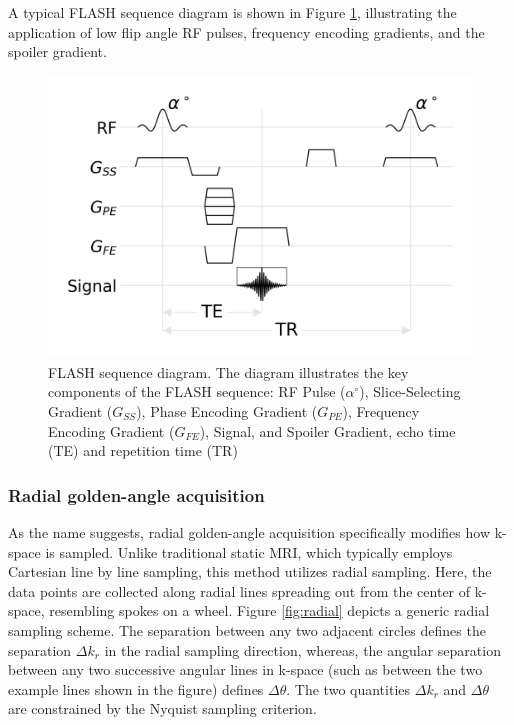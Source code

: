\documentclass{micro-econ-thesis}
\begin{document}
A typical FLASH sequence diagram is shown in Figure \ref{fig:gresimplified}, illustrating the application of low flip angle RF pulses, frequency encoding gradients, and the spoiler gradient.

\begin{figure}[H]
	\centering
	\includegraphics[width=0.7\linewidth]{flash_seq}
	\caption{FLASH sequence diagram. The diagram illustrates the key components of the FLASH sequence: RF Pulse ($\alpha^\circ$), Slice-Selecting Gradient ($G_{SS}$), Phase Encoding Gradient ($G_{PE}$), Frequency Encoding Gradient ($G_{FE}$), Signal, and Spoiler Gradient, echo time (TE) and repetition time (TR)}
	\label{fig:gresimplified}
\end{figure}

\subsubsection{Radial golden-angle acquisition}


As the name suggests, radial golden-angle acquisition specifically modifies how k-space is sampled. Unlike traditional static MRI, which typically employs Cartesian line by line sampling, this method utilizes radial sampling. Here, the data points are collected along radial lines spreading out from the center of k-space, resembling spokes on a wheel. Figure \ref{fig:radial} depicts a generic radial sampling scheme. The separation between any two adjacent circles defines the separation $\Delta k_r$ in the radial sampling direction, whereas, the angular separation between any two successive angular lines in k-space (such as between the two example lines shown in the figure) defines $\Delta \theta$. The two quantities $\Delta k_r$ and $\Delta \theta$ are constrained by the Nyquist sampling criterion. \parencite{brown_magnetic_2014} 
  
\end{document}
